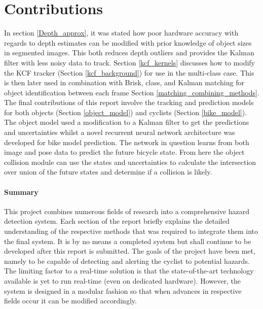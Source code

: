 \documentclass[11pt,twoside]{report}
\begin{document}
\section{Contributions}

In section \ref{Depth_approx}, it was stated how poor hardware accuracy with regards to depth estimates can be modified with prior knowledge of object sizes in segmented images. This both reduces depth outliers and provides the Kalman filter with less noisy data to track.
\newline \newline 
Section \ref{kcf_kernels} discusses how to modify the KCF tracker (Section \ref{kcf_background}) for use in the multi-class case. This is then later used in combination with Brisk, class, and Kalman matching for object identification between each frame Section \ref{matching_combining_methods}.
\newline \newline 
The final contributions of this report involve the tracking and prediction models for both objects (Section \ref{object_model}) and cyclists (Section \ref{bike_model}). The object model used a modification to a Kalman filter to get the predictions and uncertainties whilst a novel recurrent neural network architecture was developed for bike model prediction. The network in question learns from both image and pose data to predict the future bicycle state. From here the object collision module can use the states and uncertainties to calculate the intersection over union of the future states and determine if a collision is likely.


\paragraph{Summary}
This project combines numerous fields of research into a comprehensive hazard detection system. Each section of the report briefly explains the detailed understanding of the respective methods that was required to integrate them into the final system. It is by no means a completed system but shall continue to be developed after this report is submitted. The goals of the project have been met, namely to be capable of detecting and alerting the cyclist to potential hazards. The limiting factor to a real-time solution is that the state-of-the-art technology available is yet to run real-time (even on dedicated hardware). However, the system is designed in a modular fashion so that when advances in respective fields occur it can be modified accordingly.
\end{document}

